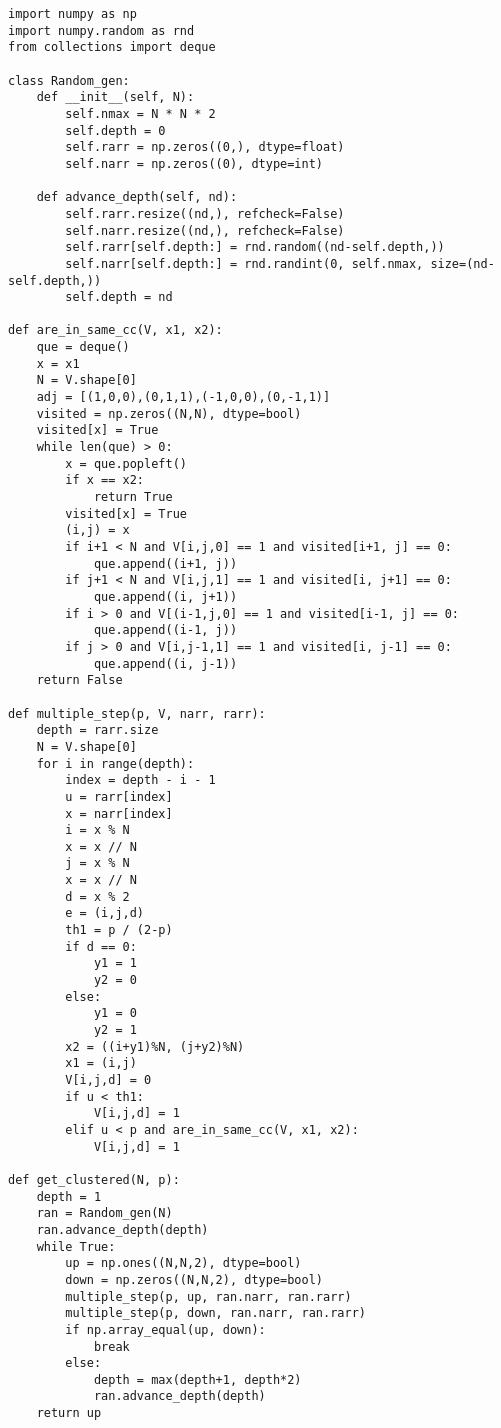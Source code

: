 \documentclass[]{marticle}
\begin{document}
\begin{lstlisting}
import numpy as np
import numpy.random as rnd
from collections import deque

class Random_gen:
    def __init__(self, N):
        self.nmax = N * N * 2
        self.depth = 0
        self.rarr = np.zeros((0,), dtype=float)
        self.narr = np.zeros((0), dtype=int)

    def advance_depth(self, nd):
        self.rarr.resize((nd,), refcheck=False)
        self.narr.resize((nd,), refcheck=False)
        self.rarr[self.depth:] = rnd.random((nd-self.depth,))
        self.narr[self.depth:] = rnd.randint(0, self.nmax, size=(nd-self.depth,))
        self.depth = nd

def are_in_same_cc(V, x1, x2):
    que = deque()
    x = x1
    N = V.shape[0]
    adj = [(1,0,0),(0,1,1),(-1,0,0),(0,-1,1)]
    visited = np.zeros((N,N), dtype=bool)
    visited[x] = True
    while len(que) > 0:
        x = que.popleft()
        if x == x2:
            return True
        visited[x] = True
        (i,j) = x
        if i+1 < N and V[i,j,0] == 1 and visited[i+1, j] == 0:
            que.append((i+1, j))
        if j+1 < N and V[i,j,1] == 1 and visited[i, j+1] == 0:
            que.append((i, j+1))
        if i > 0 and V[(i-1,j,0] == 1 and visited[i-1, j] == 0:
            que.append((i-1, j))
        if j > 0 and V[i,j-1,1] == 1 and visited[i, j-1] == 0:
            que.append((i, j-1))
    return False

def multiple_step(p, V, narr, rarr):
    depth = rarr.size
    N = V.shape[0]
    for i in range(depth):
        index = depth - i - 1
        u = rarr[index]
        x = narr[index]
        i = x % N
        x = x // N
        j = x % N
        x = x // N
        d = x % 2
        e = (i,j,d)
        th1 = p / (2-p)
        if d == 0:
            y1 = 1
            y2 = 0
        else:
            y1 = 0
            y2 = 1
        x2 = ((i+y1)%N, (j+y2)%N)
        x1 = (i,j)
        V[i,j,d] = 0
        if u < th1:
            V[i,j,d] = 1
        elif u < p and are_in_same_cc(V, x1, x2):
            V[i,j,d] = 1

def get_clustered(N, p):
    depth = 1
    ran = Random_gen(N)
    ran.advance_depth(depth)
    while True:
        up = np.ones((N,N,2), dtype=bool)
        down = np.zeros((N,N,2), dtype=bool)
        multiple_step(p, up, ran.narr, ran.rarr)
        multiple_step(p, down, ran.narr, ran.rarr)
        if np.array_equal(up, down):
            break
        else:
            depth = max(depth+1, depth*2)
            ran.advance_depth(depth)
    return up


\end{lstlisting}
\end{document}
